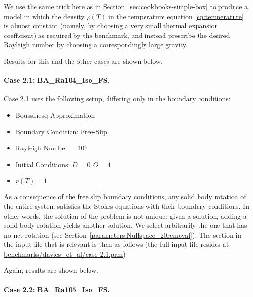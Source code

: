 \documentclass{article}
\begin{document}


We use the same trick here as in Section~\ref{sec:cookbooks-simple-box} to
produce a model in which the density $\rho(T)$ in the temperature equation
\eqref{eq:temperature} is almost constant (namely, by choosing a very small
thermal expansion coefficient) as required by the benchmark, and instead
prescribe the desired Rayleigh number by choosing a correspondingly large
gravity.

Results for this and the other cases are shown below.


\paragraph{Case 2.1: BA\_Ra104\_Iso\_FS.}
\label{sec:davies-case21_BA}

Case 2.1 uses the following setup, differing only in the boundary conditions:
\begin{itemize}
\item Boussinesq Approximation
\item Boundary Condition: Free-Slip
\item Rayleigh Number = $10^4$ 
\item Initial Conditions: $D = 0, O = 4$
\item $\eta(T) = 1$
\end{itemize}

As a consequence of the free slip boundary conditions, any solid body rotation
of the entire system satisfies the Stokes equations with their boundary
conditions. In other words, the solution of the problem is not unique: given a
solution, adding a solid body rotation yields another solution. We select
arbitrarily the one that has no net rotation (see
Section~\ref{parameters:Nullspace_20removal}). The section in the input file
that is relevant is then as follows (the full input file resides at
\url{benchmarks/davies_et_al/case-2.1.prm}):



Again, results are shown below.


\paragraph{Case 2.2: BA\_Ra105\_Iso\_FS.}
\label{sec:davies-case22_BA}
\end{document}

